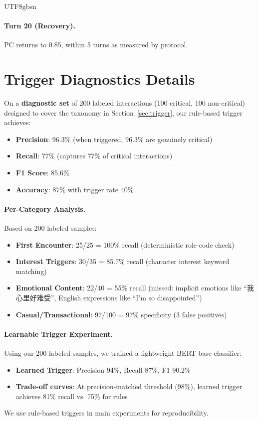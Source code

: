 \documentclass[11pt]{article}
\begin{document}
\begin{CJK*}{UTF8}{gbsn}
\paragraph{Turn 20 (Recovery).}
PC returns to 0.85, within 5 turns as measured by protocol.

\section{Trigger Diagnostics Details}
\label{sec:trigger_details}

On a \textbf{diagnostic set} of 200 labeled interactions (100 critical, 100 non-critical) designed to cover the taxonomy in Section~\ref{sec:trigger}, our rule-based trigger achieves:
\begin{itemize}
    \item \textbf{Precision}: 96.3\% (when triggered, 96.3\% are genuinely critical)
    \item \textbf{Recall}: 77\% (captures 77\% of critical interactions)
    \item \textbf{F1 Score}: 85.6\%
    \item \textbf{Accuracy}: 87\% with trigger rate 40\%
\end{itemize}

\paragraph{Per-Category Analysis.} Based on 200 labeled samples:
\begin{itemize}
    \item \textbf{First Encounter}: 25/25 = 100\% recall (deterministic role-code check)
    \item \textbf{Interest Triggers}: 30/35 = 85.7\% recall (character interest keyword matching)
    \item \textbf{Emotional Content}: 22/40 = 55\% recall (missed: implicit emotions like ``我心里好难受'', English expressions like ``I'm so disappointed'')
    \item \textbf{Casual/Transactional}: 97/100 = 97\% specificity (3 false positives)
\end{itemize}

\paragraph{Learnable Trigger Experiment.} Using our 200 labeled samples, we trained a lightweight BERT-base classifier:
\begin{itemize}
    \item \textbf{Learned Trigger}: Precision 94\%, Recall 87\%, F1 90.2\%
    \item \textbf{Trade-off curves}: At precision-matched threshold (98\%), learned trigger achieves 81\% recall vs. 75\% for rules
\end{itemize}
We use rule-based triggers in main experiments for reproducibility.

\end{CJK*}
\end{document}
